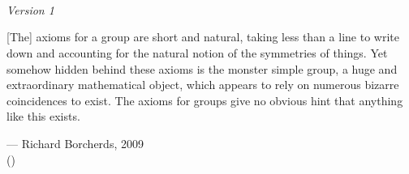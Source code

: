 
\usepackage{xr}

\linespread{1.05}




\begin{titlepage}
        \\
    \vspace{20mm}
    \\
    \vspace{\fill}
    \centering \large{\the\year}\\
    \centering \small{\textit{Version 1}}
\end{titlepage}

\newpage{}
\thispagestyle{empty}

\vspace*{2cm}

\begin{center}
    \Large{\parbox{10cm}{
        \begin{raggedright}
        {
            \large
            [The] axioms for a group are short and natural, taking less than a line to write down and accounting for the natural notion of the symmetries of things. Yet somehow hidden behind these axioms is the monster simple group, a huge and extraordinary mathematical object, which appears to rely on numerous bizarre coincidences to exist. The axioms for groups give no obvious hint that anything like this exists.
        }

            \vspace{.5cm}
            \hfill{--- Richard Borcherds, 2009}\\
            \vspace{-.25cm}
            \normalsize
            \hfill{(\cite{cook_borcherds_2009})}
        \end{raggedright}
    }
}
\end{center}


